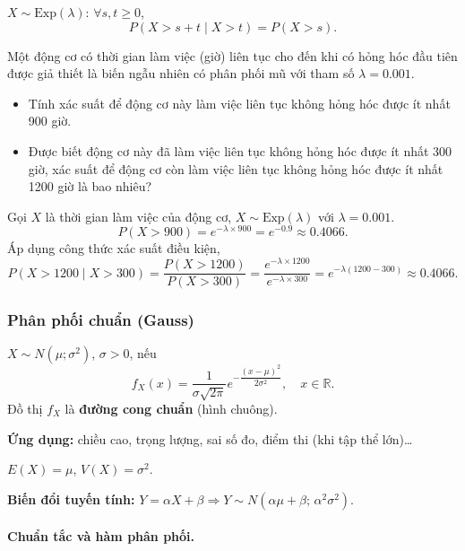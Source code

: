 \documentclass[12pt,a4paper]{article}
\begin{document}
\begin{tinhchat}[title={Tính không nhớ}]
  $X \sim \mathrm{Exp}(\lambda)$: $\forall s, t \ge 0$,
  \[
    P(X > s + t \mid X > t) = P(X > s).
  \]
\end{tinhchat}

\begin{vidu}[title={Thời gian chờ đến sự kiện đầu tiên}]
Một động cơ có thời gian làm việc (giờ) liên tục cho đến khi có hỏng hóc đầu tiên được giả thiết là biến ngẫu nhiên có phân phối mũ với tham số $\lambda = 0.001$.
\begin{itemize}
  \item Tính xác suất để động cơ này làm việc liên tục không hỏng hóc được ít nhất 900 giờ.
  \item Được biết động cơ này đã làm việc liên tục không hỏng hóc được ít nhất 300 giờ, xác suất để động cơ còn làm việc liên tục không hỏng hóc được ít nhất 1200 giờ là bao nhiêu?
\end{itemize}
Gọi $X$ là thời gian làm việc của động cơ, $X \sim \mathrm{Exp}(\lambda)$ với $\lambda = 0.001$.
\[
  P(X > 900) = e^{-\lambda \times 900} = e^{-0.9} \approx 0.4066.
\]
Áp dụng công thức xác suất điều kiện,
\[
  P(X > 1200 \mid X > 300) = \dfrac{P(X > 1200)}{P(X > 300)} = \dfrac{e^{-\lambda \times 1200}}{e^{-\lambda \times 300}} = e^{-\lambda (1200-300)} \approx 0.4066.
\]
\end{vidu}

\subsubsection{Phân phối chuẩn (Gauss)}

\begin{dinhnghia}
  $X \sim N(\mu; \sigma^2)$, $\sigma > 0$, nếu
  \[
    f_X(x) = \dfrac{1}{\sigma\sqrt{2\pi}}e^{-\dfrac{(x-\mu)^2}{2\sigma^2}}, \quad x \in \mathbb{R}.
  \]
  Đồ thị $f_X$ là \textbf{đường cong chuẩn} (hình chuông).
  
  \textbf{Ứng dụng:} chiều cao, trọng lượng, sai số đo, điểm thi (khi tập thể lớn)\ldots
\end{dinhnghia}

\begin{dinhly}
  $E(X) = \mu$, \quad $V(X) = \sigma^2$.

  \textbf{Biến đổi tuyến tính:} $Y = \alpha X + \beta \Rightarrow Y \sim N(\alpha\mu + \beta;\, \alpha^2\sigma^2)$.
\end{dinhly}

\paragraph{Chuẩn tắc và hàm phân phối.}
\end{document}
